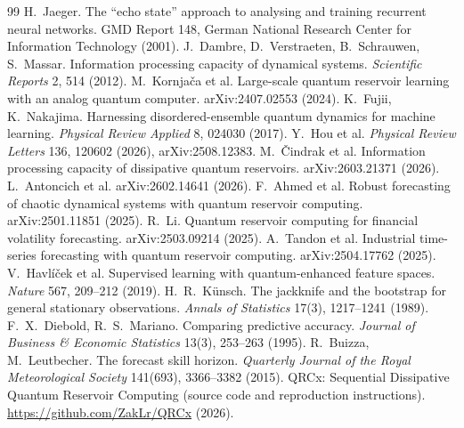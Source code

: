 \documentclass[11pt,twocolumn]{article}
\begin{document}

\begin{thebibliography}{99}
 H.~Jaeger. The ``echo state'' approach to analysing and training recurrent
neural networks. GMD Report 148, German National Research Center for Information Technology
(2001).
 J.~Dambre, D.~Verstraeten, B.~Schrauwen, S.~Massar. Information processing
capacity of dynamical systems. \emph{Scientific Reports} 2, 514 (2012).
 M.~Kornja\v{c}a et al. Large-scale quantum reservoir learning with an
analog quantum computer. arXiv:2407.02553 (2024).
 K.~Fujii, K.~Nakajima. Harnessing disordered-ensemble quantum dynamics for
machine learning. \emph{Physical Review Applied} 8, 024030 (2017).
 Y.~Hou et al. \emph{Physical Review Letters} 136, 120602 (2026), arXiv:2508.12383.
 M.~\v{C}indrak et al. Information processing capacity of dissipative
quantum reservoirs. arXiv:2603.21371 (2026).
 L.~Antoncich et al. arXiv:2602.14641 (2026).
 F.~Ahmed et al. Robust forecasting of chaotic dynamical systems with quantum
reservoir computing. arXiv:2501.11851 (2025).
 R.~Li. Quantum reservoir computing for financial volatility forecasting.
arXiv:2503.09214 (2025).
 A.~Tandon et al. Industrial time-series forecasting with quantum reservoir
computing. arXiv:2504.17762 (2025).
 V.~Havl\'{i}\v{c}ek et al. Supervised learning with quantum-enhanced
feature spaces. \emph{Nature} 567, 209--212 (2019).
 H.~R.~K\"unsch. The jackknife and the bootstrap for general stationary
observations. \emph{Annals of Statistics} 17(3), 1217--1241 (1989).
 F.~X.~Diebold, R.~S.~Mariano. Comparing predictive accuracy.
\emph{Journal of Business \& Economic Statistics} 13(3), 253--263 (1995).
 R.~Buizza, M.~Leutbecher. The forecast skill horizon. \emph{Quarterly
Journal of the Royal Meteorological Society} 141(693), 3366--3382 (2015).
 QRCx: Sequential Dissipative Quantum Reservoir Computing (source code and
reproduction instructions). \url{https://github.com/ZakLr/QRCx} (2026).
\end{thebibliography}
\end{document}
